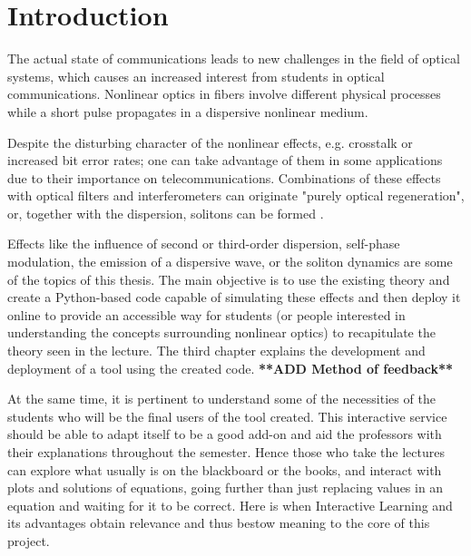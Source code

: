 \chapter{Introduction}

The actual state of communications leads to new challenges in the field of optical systems, which causes an increased interest from students in optical communications. Nonlinear optics in fibers involve different physical processes while a short pulse propagates in a dispersive nonlinear medium. 

Despite the disturbing character of the nonlinear effects, e.g. crosstalk or increased bit error rates; one can take advantage of them in some applications due to their importance on telecommunications. Combinations of these effects with optical filters and interferometers can originate "purely optical regeneration",  or, together with the dispersion, solitons can be formed \cite{rein}.


Effects like the influence of second or third-order dispersion, self-phase modulation, the emission of a dispersive wave, or the soliton dynamics are some of the topics of this thesis. The main objective is to use the existing theory and create a Python-based code capable of simulating these effects and then deploy it online to provide an accessible way for students (or people interested in understanding the concepts surrounding nonlinear optics) to recapitulate the theory seen in the lecture. The third chapter explains the development and deployment of a tool using the created code. \textbf{**ADD Method of feedback**} 

At the same time, it is pertinent to understand some of the necessities of the students who will be the final users of the tool created. This interactive service should be able to adapt itself to be a good add-on and aid the professors with their explanations throughout the semester. Hence those who take the lectures can explore what usually is on the blackboard or the books, and interact with plots and solutions of equations, going further than just replacing values in an equation and waiting for it to be correct. Here is when Interactive Learning and its advantages obtain relevance and thus bestow meaning to the core of this project.

